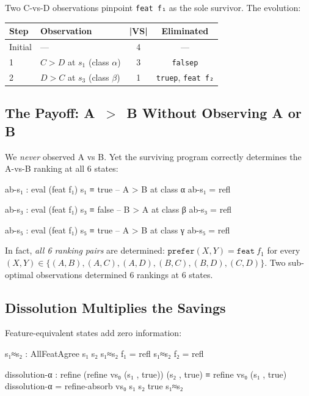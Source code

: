 \noindent Two C-vs-D observations pinpoint \texttt{feat~f₁} as the sole survivor.  The evolution:

\medskip
\begin{center}
\begin{tabular}{llcc}
\textbf{Step} & \textbf{Observation} & \textbf{|VS|} & \textbf{Eliminated} \\
\hline
Initial & --- & 4 & --- \\
1 & $C > D$ at $s_1$ (class $\alpha$) & 3 & \texttt{falsep} \\
2 & $D > C$ at $s_3$ (class $\beta$) & 1 & \texttt{truep}, \texttt{feat~f₂} \\
\end{tabular}
\end{center}

\subsection{The Payoff: A~$>$~B Without Observing A or B}

We \emph{never} observed A vs B.  Yet the surviving program correctly determines the A-vs-B ranking at all 6 states:

\begin{spec}
ab-s₁ : eval (feat f₁) s₁ ≡ true    -- A > B at class α
ab-s₁ = refl

ab-s₃ : eval (feat f₁) s₃ ≡ false   -- B > A at class β
ab-s₃ = refl

ab-s₅ : eval (feat f₁) s₅ ≡ true    -- A > B at class γ
ab-s₅ = refl
\end{spec}

\noindent In fact, \emph{all 6 ranking pairs} are determined: $\texttt{prefer}(X,Y) = \texttt{feat}~f_1$ for every $(X,Y) \in \{(A,B), (A,C), (A,D), (B,C), (B,D), (C,D)\}$.  Two sub-optimal observations determined 6 rankings at 6 states.

\subsection{Dissolution Multiplies the Savings}

Feature-equivalent states add zero information:

\begin{spec}
s₁≈s₂ : AllFeatAgree s₁ s₂
s₁≈s₂ f₁ = refl
s₁≈s₂ f₂ = refl

dissolution-α : refine (refine vs₀ (s₁ , true)) (s₂ , true)
              ≡ refine vs₀ (s₁ , true)
dissolution-α = refine-absorb vs₀ s₁ s₂ true s₁≈s₂
\end{spec}

